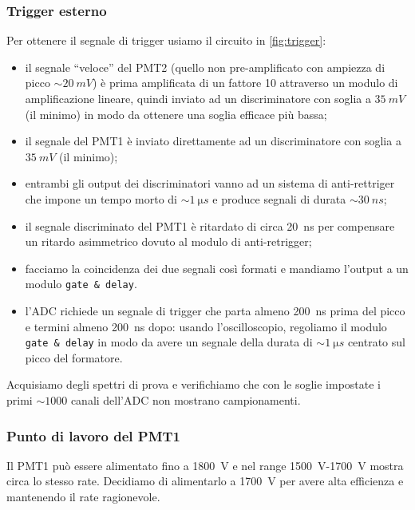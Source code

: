 \subsubsection{Trigger esterno}
Per ottenere il segnale di trigger usiamo il circuito in \autoref{fig:trigger}:
\begin{itemize}
	\item il segnale ``veloce'' del PMT2 (quello non pre-amplificato con ampiezza di picco $\sim\SI{20}{mV}$) è prima amplificata di un fattore 10 attraverso un modulo di amplificazione lineare, quindi inviato ad un discriminatore con soglia a $\SI{35}{mV}$ (il minimo) in modo da ottenere una soglia efficace più bassa;
	\item il segnale del PMT1 è inviato direttamente ad un discriminatore con soglia a $\SI{35}{mV}$ (il minimo);
	\item entrambi gli output dei discriminatori vanno ad un sistema di anti-rettriger che impone un tempo morto di $\sim\SI{1}{\micro s}$ e produce segnali di durata $\sim\SI{30}{ns}$;
	\item il segnale discriminato del PMT1 è ritardato di circa \SI{20}{ns} per compensare un ritardo asimmetrico dovuto al modulo di anti-retrigger;
	\item facciamo la coincidenza dei due segnali così formati e mandiamo l'output a un modulo \texttt{gate \& delay}.
	\item l'ADC richiede un segnale di trigger che parta almeno \SI{200}{ns} prima del picco e termini almeno \SI{200}{ns} dopo: usando l'oscilloscopio, regoliamo il modulo \texttt{gate \& delay} in modo da avere un segnale della durata di $\sim\SI{1}{\micro s}$ centrato sul picco del formatore.
\end{itemize}
Acquisiamo degli spettri di prova e verifichiamo che con le soglie impostate i primi $\sim1000$ canali dell'ADC non mostrano campionamenti.

\subsubsection{Punto di lavoro del PMT1}
Il PMT1 può essere alimentato fino a \SI{1800}{V} e nel range \SI{1500}{V}-\SI{1700}{V} mostra circa lo stesso rate. Decidiamo di alimentarlo a \SI{1700}{V} per avere alta efficienza e mantenendo il rate ragionevole.
